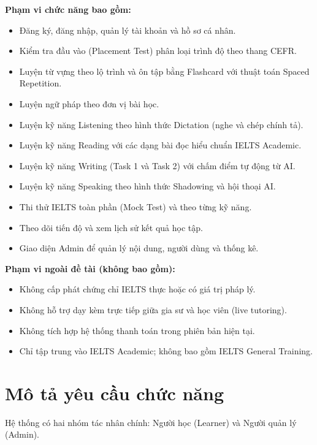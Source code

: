 \documentclass[a4paper,12pt]{extreport}
\begin{document}
\textbf{Phạm vi chức năng bao gồm:}
\begin{itemize}
    \item Đăng ký, đăng nhập, quản lý tài khoản và hồ sơ cá nhân.
    \item Kiểm tra đầu vào (Placement Test) phân loại trình độ theo thang CEFR.
    \item Luyện từ vựng theo lộ trình và ôn tập bằng Flashcard với thuật toán Spaced Repetition.
    \item Luyện ngữ pháp theo đơn vị bài học.
    \item Luyện kỹ năng Listening theo hình thức Dictation (nghe và chép chính tả).
    \item Luyện kỹ năng Reading với các dạng bài đọc hiểu chuẩn IELTS Academic.
    \item Luyện kỹ năng Writing (Task 1 và Task 2) với chấm điểm tự động từ AI.
    \item Luyện kỹ năng Speaking theo hình thức Shadowing và hội thoại AI.
    \item Thi thử IELTS toàn phần (Mock Test) và theo từng kỹ năng.
    \item Theo dõi tiến độ và xem lịch sử kết quả học tập.
    \item Giao diện Admin để quản lý nội dung, người dùng và thống kê.
\end{itemize}

\textbf{Phạm vi ngoài đề tài (không bao gồm):}
\begin{itemize}
    \item Không cấp phát chứng chỉ IELTS thực hoặc có giá trị pháp lý.
    \item Không hỗ trợ dạy kèm trực tiếp giữa gia sư và học viên (live tutoring).
    \item Không tích hợp hệ thống thanh toán trong phiên bản hiện tại.
    \item Chỉ tập trung vào IELTS Academic; không bao gồm IELTS General Training.
\end{itemize}

\section{Mô tả yêu cầu chức năng}

Hệ thống có hai nhóm tác nhân chính: Người học (Learner) và Người quản lý (Admin).
\end{document}
